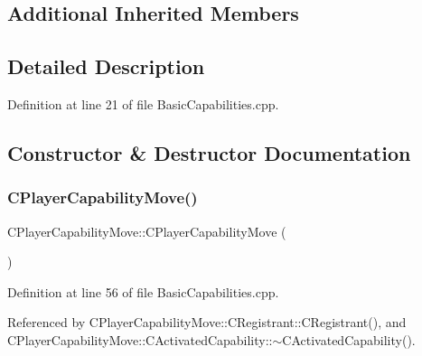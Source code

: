 \subsection*{Additional Inherited Members}


\subsection{Detailed Description}


Definition at line 21 of file Basic\+Capabilities.\+cpp.



\subsection{Constructor \& Destructor Documentation}
\hypertarget{classCPlayerCapabilityMove_a6bfe72663b6b5fc708d23373dc293ec7}{}\label{classCPlayerCapabilityMove_a6bfe72663b6b5fc708d23373dc293ec7} 
\subsubsection{\texorpdfstring{C\+Player\+Capability\+Move()}{CPlayerCapabilityMove()}}
{\footnotesize\ttfamily C\+Player\+Capability\+Move\+::\+C\+Player\+Capability\+Move (\begin{DoxyParamCaption}{ }\end{DoxyParamCaption})\hspace{0.3cm}{\ttfamily [protected]}}



Definition at line 56 of file Basic\+Capabilities.\+cpp.



Referenced by C\+Player\+Capability\+Move\+::\+C\+Registrant\+::\+C\+Registrant(), and C\+Player\+Capability\+Move\+::\+C\+Activated\+Capability\+::$\sim$\+C\+Activated\+Capability().


